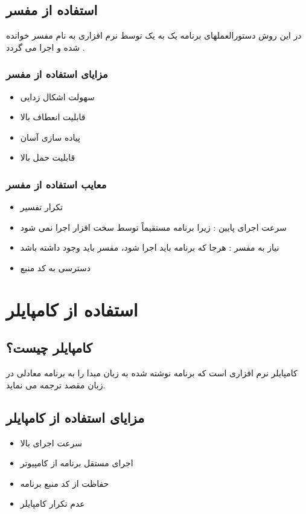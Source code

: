 \documentclass{book}
\begin{document}
\subsection{استفاده از مفسر}
در این روش دستورالعملهای برنامه یک به یک توسط نرم افزاری به نام مفسر خوانده شده و اجرا می گردد . 

\subsubsection{مزایای استفاده از مفسر}

\begin{itemize}
	\item سهولت اشکال زدایی
	\item قابلیت انعطاف بالا
	\item پیاده سازی آسان
	\item قابلیت حمل بالا
\end{itemize}


\subsubsection{معایب استفاده از مفسر}

\begin{itemize}
	\item تکرار تفسیر
	\item سرعت اجرای پایین : زیرا برنامه مستقیماً توسط سخت افزار اجرا نمی شود
	\item نیاز به مفسر : هرجا که برنامه باید اجرا شود، مفسر باید وجود داشته باشد
	\item دسترسی به کد منبع
\end{itemize}


\section{استفاده از کامپایلر}

\subsection{کامپایلر چیست؟}
کامپایلر نرم افزاری است که برنامه نوشته شده به زبان مبدا را به برنامه معادلی در زبان مقصد ترجمه می نماید. 


\subsection{مزایای استفاده از کامپایلر}

\begin{itemize}
	\item سرعت اجرای بالا
	\item اجرای مستقل برنامه از کامپیوتر
	\item حفاظت از کد منبع برنامه
	\item عدم تکرار کامپایلر
\end{itemize}
\end{document}
